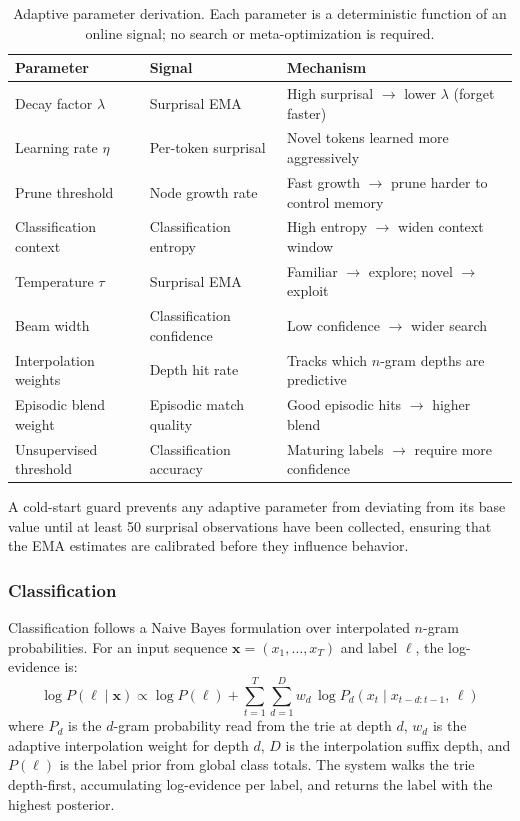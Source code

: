 \begin{table}[h]
  \centering
  \caption{Adaptive parameter derivation.  Each parameter is a
           deterministic function of an online signal; no search or
           meta-optimization is required.}
  \label{tab:adaptive_params}
  \begin{tabular}{lll}
    \toprule
    \textbf{Parameter} & \textbf{Signal} & \textbf{Mechanism} \\
    \midrule
    Decay factor $\lambda$
      & Surprisal EMA
      & High surprisal $\to$ lower $\lambda$ (forget faster) \\
    Learning rate $\eta$
      & Per-token surprisal
      & Novel tokens learned more aggressively \\
    Prune threshold
      & Node growth rate
      & Fast growth $\to$ prune harder to control memory \\
    Classification context
      & Classification entropy
      & High entropy $\to$ widen context window \\
    Temperature $\tau$
      & Surprisal EMA
      & Familiar $\to$ explore; novel $\to$ exploit \\
    Beam width
      & Classification confidence
      & Low confidence $\to$ wider search \\
    Interpolation weights
      & Depth hit rate
      & Tracks which $n$-gram depths are predictive \\
    Episodic blend weight
      & Episodic match quality
      & Good episodic hits $\to$ higher blend \\
    Unsupervised threshold
      & Classification accuracy
      & Maturing labels $\to$ require more confidence \\
    \bottomrule
  \end{tabular}
\end{table}

A cold-start guard prevents any adaptive parameter from deviating from
its base value until at least 50 surprisal observations have been
collected, ensuring that the EMA estimates are calibrated before they
influence behavior.

\subsubsection{Classification}

Classification follows a Naive Bayes formulation over interpolated
$n$-gram probabilities.  For an input sequence
$\mathbf{x} = (x_1, \ldots, x_T)$ and label $\ell$, the log-evidence
is:
\begin{equation}
  \log P(\ell \mid \mathbf{x})
    \propto \log P(\ell)
    + \sum_{t=1}^{T} \sum_{d=1}^{D}
      w_d \,\log P_d(x_t \mid x_{t-d:t-1},\, \ell)
  \label{eq:classification}
\end{equation}
where $P_d$ is the $d$-gram probability read from the trie at depth
$d$, $w_d$ is the adaptive interpolation weight for depth $d$, $D$ is
the interpolation suffix depth, and $P(\ell)$ is the label prior from
global class totals.  The system walks the trie depth-first,
accumulating log-evidence per label, and returns the label with the
highest posterior.

